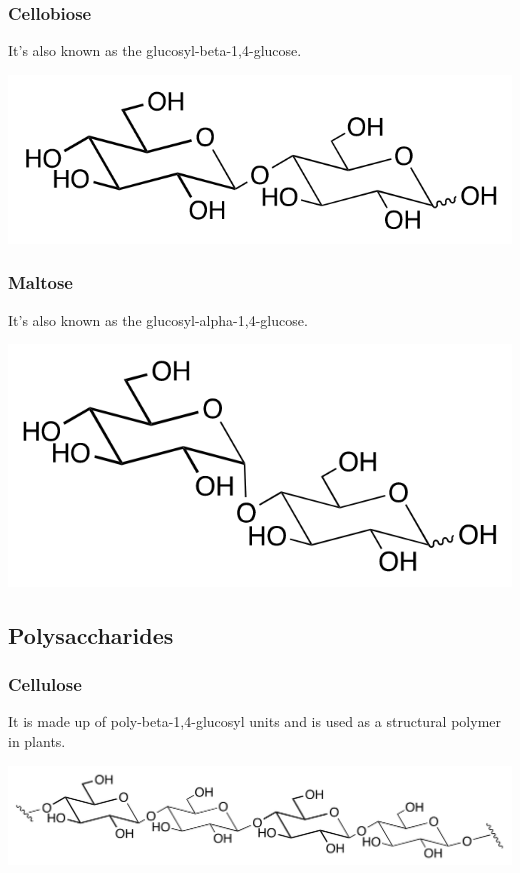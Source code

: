 \documentclass[11pt]{article}
\begin{document}
\subsubsection{Cellobiose}
\label{sec:org6ef0ebb}
It's also known as the glucosyl-beta-1,4-glucose.
\begin{center}
\includegraphics[width=.9\linewidth]{./images/cellobiose.png}
\end{center}

\newpage

\subsubsection{Maltose}
\label{sec:org08dbf38}
It's also known as the glucosyl-alpha-1,4-glucose.
\begin{center}
\includegraphics[width=.9\linewidth]{./images/maltose.png}
\end{center}

\subsection{Polysaccharides}
\label{sec:org340842b}

\subsubsection{Cellulose}
\label{sec:org959e3bd}
It is made up of poly-beta-1,4-glucosyl units and is used as a structural polymer in plants.
\begin{center}
\includegraphics[width=.9\linewidth]{./images/cellulose.png}
\end{center}
\end{document}
